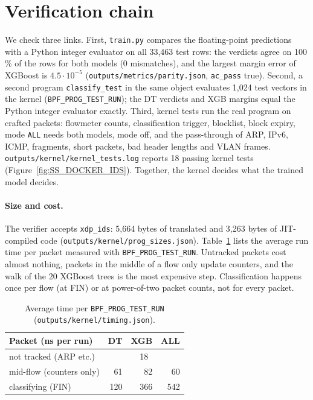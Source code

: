 \section{Verification chain}\label{sec:verify}
We check three links. First, \texttt{train.py} compares the floating-point predictions with a Python integer evaluator on all 33,463 test rows: the verdicts agree on 100\,\% of the rows for both models (0 mismatches), and the largest margin error of XGBoost is $4.5\cdot 10^{-5}$ (\texttt{outputs/metrics/parity.json}, \texttt{ac\_pass} true). Second, a second program \texttt{classify\_test} in the same object evaluates 1,024 test vectors in the kernel (\texttt{BPF\_PROG\_TEST\_RUN}); the DT verdicts and XGB margins equal the Python integer evaluator exactly. Third, kernel tests run the real program on crafted packets: flowmeter counts, classification trigger, blocklist, block expiry, mode \texttt{ALL} needs both models, mode off, and the pass-through of ARP, IPv6, ICMP, fragments, short packets, bad header lengths and VLAN frames. \texttt{outputs/kernel/kernel\_tests.log} reports 18 passing kernel tests (Figure~\ref{fig:SS_DOCKER_IDS}). Together, the kernel decides what the trained model decides.


\paragraph{Size and cost.} The verifier accepts \texttt{xdp\_ids}: 5,664 bytes of translated and 3,263 bytes of JIT-compiled code (\texttt{outputs/kernel/prog\_sizes.json}). Table~\ref{tab:timing} lists the average run time per packet measured with \texttt{BPF\_PROG\_TEST\_RUN}. Untracked packets cost almost nothing, packets in the middle of a flow only update counters, and the walk of the 20 XGBoost trees is the most expensive step. Classification happens once per flow (at FIN) or at power-of-two packet counts, not for every packet.

\begin{table}[htb]
\centering\small
\begin{tabular}{@{}lrrr@{}}
\toprule
Packet (ns per run) & DT & XGB & ALL \\
\midrule
not tracked (ARP etc.) & \multicolumn{3}{c}{18} \\
mid-flow (counters only) & 61 & 82 & 60 \\
classifying (FIN) & 120 & 366 & 542 \\
\bottomrule
\end{tabular}
\caption{Average time per \texttt{BPF\_PROG\_TEST\_RUN} (\texttt{outputs/kernel/timing.json}).}\label{tab:timing}
\end{table}

